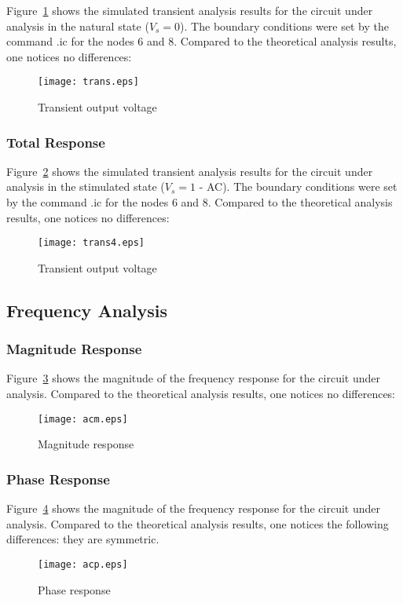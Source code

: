 Figure~\ref{fig:trans} shows the simulated transient analysis results for the
circuit under analysis in the natural state ($V_{s}=0$). The boundary conditions were set by the command .ic for the nodes 6 and 8. Compared to the theoretical analysis results, one notices no differences:

\begin{figure}[h] \centering
\texttt{[image: trans.eps]}
\caption{Transient output voltage}
\label{fig:trans}
\end{figure}

\subsubsection{Total Response}

Figure~\ref{fig:trans4} shows the simulated transient analysis results for the
circuit under analysis in the stimulated state ($V_{s}=1$ - AC). The boundary conditions were set by the command .ic for the nodes 6 and 8. Compared to the theoretical analysis results, one notices no differences:

\begin{figure}[h] \centering
\texttt{[image: trans4.eps]}
\caption{Transient output voltage}
\label{fig:trans4}
\end{figure}


\subsection{Frequency Analysis}

\subsubsection{Magnitude Response}

Figure~\ref{fig:acm} shows the magnitude of the frequency response for the
circuit under analysis. Compared to the theoretical analysis results, one
notices no differences:

\begin{figure}[h] \centering
\texttt{[image: acm.eps]}
\caption{Magnitude response}
\label{fig:acm}
\end{figure}



\subsubsection{Phase Response}

Figure~\ref{fig:acp} shows the magnitude of the frequency response for the
circuit under analysis. Compared to the theoretical analysis results, one
notices the following differences: they are symmetric.

\begin{figure}[h] \centering
\texttt{[image: acp.eps]}
\caption{Phase response}
\label{fig:acp}
\end{figure}
